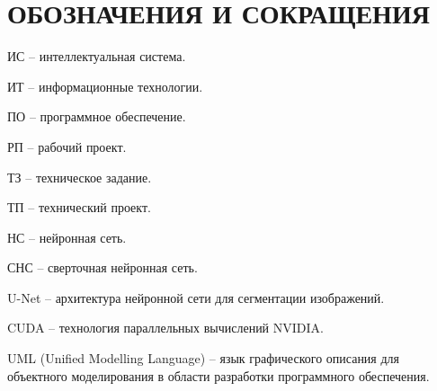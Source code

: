 \section*{ОБОЗНАЧЕНИЯ И СОКРАЩЕНИЯ}

ИС -- интеллектуальная система.

ИТ -- информационные технологии. 

ПО -- программное обеспечение.

РП -- рабочий проект.

ТЗ -- техническое задание.

ТП -- технический проект.

НС -- нейронная сеть.

СНС -- сверточная нейронная сеть.

U-Net -- архитектура нейронной сети для сегментации изображений.

CUDA -- технология параллельных вычислений NVIDIA.

UML (Unified Modelling Language) -- язык графического описания для объектного моделирования в области разработки программного обеспечения.
